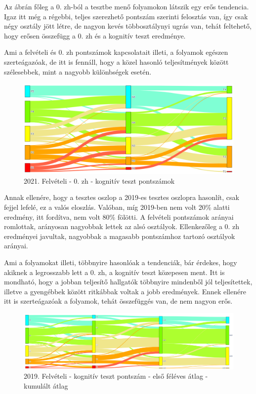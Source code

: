 \documentclass[12pt]{article}
\begin{document}
Az ábrán főleg a 0. zh-ból a tesztbe menő folyamokon látszik egy erős tendencia. Igaz itt még a régebbi, teljes szerezhető pontszám szerinti felosztás van, így csak négy osztály jött létre, de nagyon kevés többosztálynyi ugrás van, tehát feltehető, hogy erősen összefügg a 0. zh és a kognitív teszt eredménye.

Ami a felvételi és 0. zh pontszámok kapcsolatait illeti, a folyamok egészen szerteágazóak, de itt is fennáll, hogy a közel hasonló teljesítmények között szélesebbek, mint a nagyobb különbségek esetén.

\begin{figure}[H]
\centering
\includegraphics[scale=0.573]{kepek/2021_old_felvi_0zh_teszt.png}
\caption{2021. Felvételi - 0. zh - kognitív teszt pontszámok}
\label{fig:2021_old_felvi_0zh_teszt}
\end{figure}

Annak ellenére, hogy a tesztes oszlop a 2019-es tesztes oszlopra hasonlít, csak fejjel lefelé, ez a valós eloszlás. Valóban, míg 2019-ben nem volt 20\% alatti eredmény, itt fordítva, nem volt 80\% fölötti. A felvételi pontszámok arányai romlottak, arányosan nagyobbak lettek az alsó osztályok. Ellenkezőleg a 0. zh eredményei javultak, nagyobbak a magasabb pontszámhoz tartozó osztályok arányai. 

Ami a folyamokat illeti, többnyire hasonlóak a tendenciák, bár érdekes, hogy akiknek a legrosszabb lett a 0. zh, a kognitív teszt közepesen ment. Itt is mondható, hogy a jobban teljesítő hallgatók többnyire mindenből jól teljesítettek, illetve a gyengébbek között ritkábbak voltak a jobb eredmények. Ennek ellenére itt is szerteágazóak a folyamok, tehát összefüggés van, de nem nagyon erős.


\begin{figure}[H]
\centering
\includegraphics[scale=0.6]{kepek/2019_felvi_teszt_atlag_kumatlag.png}
\caption{2019. Felvételi - kognitív teszt pontszám - első féléves átlag - kumulált átlag}
\label{fig:2019_felvi_teszt_atlag_kumatlag}
\end{figure}
\end{document}
